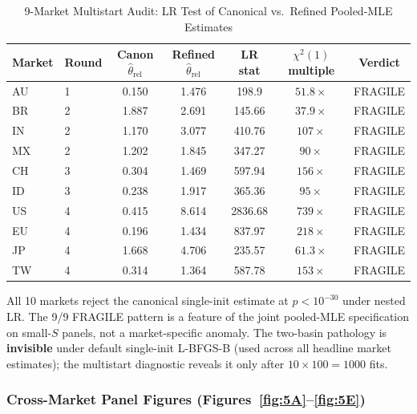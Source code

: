 \documentclass[12pt,a4paper]{article}
\begin{document}
\begin{table}[htbp]
\caption{9-Market Multistart Audit: LR Test of Canonical vs.\ Refined Pooled-MLE Estimates}
\label{tab:multistart_lr}
\centering
\begin{threeparttable}
\small
\begin{tabular}{llccccc}
\toprule
Market & Round & Canon $\hat{\theta}_{\mathrm{rel}}$ & Refined $\hat{\theta}_{\mathrm{rel}}$ & LR stat & $\chi^2(1)$ multiple & Verdict \\
\midrule
AU & 1 & 0.150 & 1.476 & 198.9   & $51.8\times$ & FRAGILE \\
BR & 2 & 1.887 & 2.691 & 145.66  & $37.9\times$ & FRAGILE \\
IN & 2 & 1.170 & 3.077 & 410.76  & $107\times$  & FRAGILE \\
MX & 2 & 1.202 & 1.845 & 347.27  & $90\times$   & FRAGILE \\
CH & 3 & 0.304 & 1.469 & 597.94  & $156\times$  & FRAGILE \\
ID & 3 & 0.238 & 1.917 & 365.36  & $95\times$   & FRAGILE \\
US & 4 & 0.415 & 8.614 & 2836.68 & $739\times$  & FRAGILE \\
EU & 4 & 0.196 & 1.434 & 837.97  & $218\times$  & FRAGILE \\
JP & 4 & 1.668 & 4.706 & 235.57  & $61.3\times$ & FRAGILE \\
TW & 4 & 0.314 & 1.364 & 587.78  & $153\times$  & FRAGILE \\
\bottomrule
\end{tabular}
\begin{tablenotes}
\small
\item[*] All 10 markets reject the canonical single-init estimate at $p < 10^{-30}$
under nested LR. The 9/9 FRAGILE pattern is a feature of the joint
pooled-MLE specification on small-$S$ panels, not a market-specific anomaly.
The two-basin pathology is \textbf{invisible} under default single-init L-BFGS-B
(used across all headline market estimates); the multistart diagnostic reveals it
only after $10 \times 100 = 1000$ fits.
\end{tablenotes}
\end{threeparttable}
\end{table}

\subsubsection*{Cross-Market Panel Figures (Figures~\ref{fig:5A}--\ref{fig:5E})}
\end{document}
